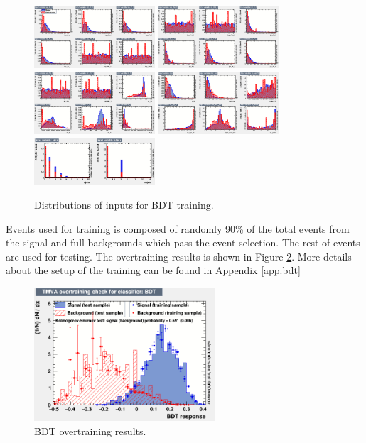 \begin{figure}[H]
	\caption{Distributions of inputs for BDT training.}
	\label{Fig.inputs}
	\centering
	\includegraphics[width=0.4\textwidth]{figures/4lbb/variables_id_c1.eps}
	\includegraphics[width=0.4\textwidth]{figures/4lbb/variables_id_c2.eps}
	\includegraphics[width=0.4\textwidth]{figures/4lbb/variables_id_c3.eps}
	\includegraphics[width=0.4\textwidth]{figures/4lbb/variables_id_c4.eps}
	\includegraphics[width=0.4\textwidth]{figures/4lbb/variables_id_c5.eps}
\end{figure}

Events used for training is composed of randomly 90\% of the total events from the signal  and full backgrounds which pass the event selection. The rest of events are used for testing. The overtraining results is shown in Figure \ref{Fig.overtraining}. More details about the setup of the training can be found in Appendix \ref{app.bdt}

\begin{figure}[H]
	\caption{BDT overtraining results.}
	\label{Fig.overtraining}
	\centering
	\includegraphics[width=0.6\textwidth]{figures/4lbb/overtrain_BDT.png}
\end{figure}


